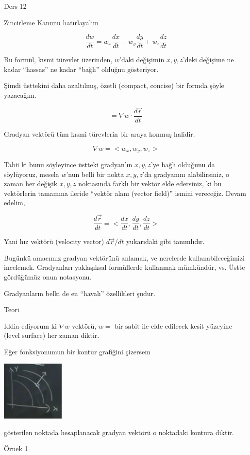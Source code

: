 \documentclass[12pt,fleqn]{article}\usepackage{../../common}
\begin{document}
Ders 12

Zincirleme Kanunu hatırlayalım

$$ \frac{dw}{dt}  = w_x \frac{dx}{dt} + 
w_y \frac{dy}{dt} + 
w_z \frac{dz}{dt}  $$

Bu formül, kısmi türevler üzerinden, $w$'daki değişimin $x,y,z$'deki
değişime ne kadar ``hassas'' ne kadar ``bağlı'' olduğnu gösteriyor.

Şimdi üsttekini daha azaltılmış, özetli (compact, concise) bir formda şöyle
yazacağım. 

$$ 
= \nabla w \cdot  \frac{d\vec{r}}{dt} 
$$

Gradyan vektörü tüm kısmi türevlerin bir araya konmuş halidir. 

$$ \nabla w = < w_x, w_y, w_z > $$

Tabii ki bunu söyleyince üstteki gradyan'ın $x,y,z$'ye bağlı olduğunu da
söylüyoruz, mesela $w$'nun belli bir nokta $x,y,z$'da gradyanını
alabilirsiniz, o zaman her değişik $x,y,z$ noktasında farklı bir vektör
elde edersiniz, ki bu vektörlerin tamamına ileride ``vektör alanı (vector
field)'' ismini vereceğiz. Devam edelim, 

$$ \frac{d\vec{r}}{dt} = < \frac{dx}{dt}, \frac{dy}{dt}, \frac{dz}{dt} > $$

Yani hız vektörü (velocity vector) $d\vec{r}/{dt}$ yukarıdaki gibi
tanımlıdır.

Bugünkü amacımız gradyan vektörünü anlamak, ve nerelerde
kullanabileceğimizi incelemek. Gradyanları yaklaşıksal formüllerde
kullanmak mümkündür, vs. Üstte gördüğümüz onun notasyonu. 

Gradyanların belki de en ``havalı'' özellikleri şudur. 

Teori

İddia ediyorum ki $\nabla w$ vektörü, $w = \textrm{ bir sabit }$ile elde
edilecek kesit yüzeyine (level surface) her zaman diktir.

Eğer fonksiyonumun bir kontur grafiğini çizersem

\includegraphics[height=3cm]{12_1.png}

gösterilen noktada hesaplanacak gradyan vektörü o noktadaki kontura diktir.

Örnek 1
\end{document}
